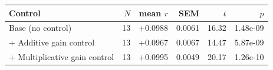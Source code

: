 \begin{tabular}{lrrrrr}
  \toprule
  Control & $N$ & mean $r$ & SEM & $t$ & $p$ \\
  \midrule
  Base (no control) & 13 & +0.0988 & 0.0061 & 16.32 & 1.48e-09 \\
  + Additive gain control & 13 & +0.0967 & 0.0067 & 14.47 & 5.87e-09 \\
  + Multiplicative gain control & 13 & +0.0995 & 0.0049 & 20.17 & 1.26e-10 \\
  \bottomrule
\end{tabular}
